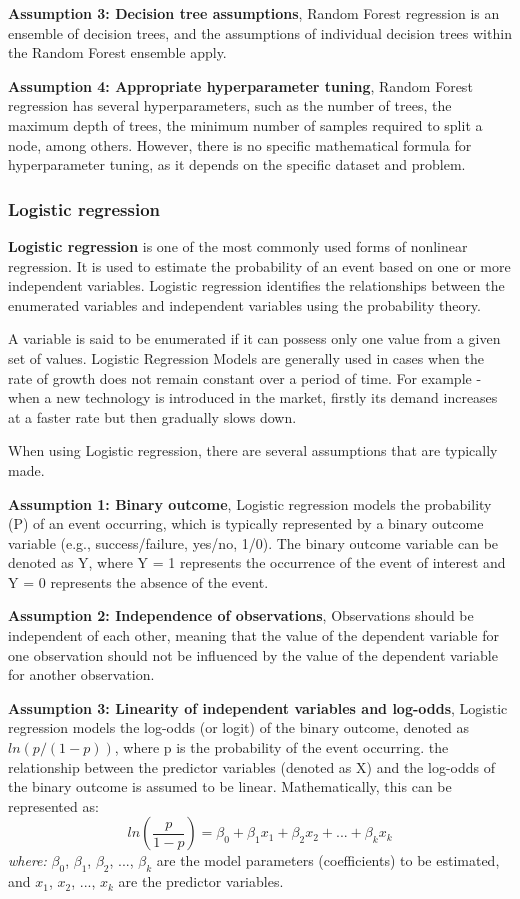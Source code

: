 \textbf{Assumption 3: Decision tree assumptions}, Random Forest regression is an ensemble of decision trees, and the assumptions of individual decision trees within the Random Forest ensemble apply.

\textbf{Assumption 4: Appropriate hyperparameter tuning}, Random Forest regression has several hyperparameters, such as the number of trees, the maximum depth of trees, the minimum number of samples required to split a node, among others. However, there is no specific mathematical formula for hyperparameter tuning, as it depends on the specific dataset and problem.
\subsubsection{Logistic regression}
\textbf{Logistic regression} is one of the most commonly used forms of nonlinear regression. It is used to estimate the probability of an event based on one or more independent variables. Logistic regression identifies the relationships between the enumerated variables and independent variables using the probability theory.

 A variable is said to be enumerated if it can possess only one value from a given set of values. Logistic Regression Models are generally used in cases when the rate of growth does not remain constant over a period of time. For example -when a new technology is introduced in the market, firstly its demand increases at a faster rate but then gradually slows down.
 
 When using Logistic regression, there are several assumptions that are typically made.
 
\textbf{Assumption 1: Binary outcome}, Logistic regression models the probability (P) of an event occurring, which is typically represented by a binary outcome variable (e.g., success/failure, yes/no, 1/0). The binary outcome variable can be denoted as Y, where Y = 1 represents the occurrence of the event of interest and Y = 0 represents the absence of the event.

\textbf{Assumption 2: Independence of observations}, Observations should be independent of each other, meaning that the value of the dependent variable for one observation should not be influenced by the value of the dependent variable for another observation.

\textbf{Assumption 3: Linearity of independent variables and log-odds}, Logistic regression models the log-odds (or logit) of the binary outcome, denoted as $ln(p/(1-p))$, where p is the probability of the event occurring. the relationship between the predictor variables (denoted as X) and the log-odds of the binary outcome is assumed to be linear. Mathematically, this can be represented as:
$$
ln\left(\frac{p}{1-p}\right)={\beta}_{0}+{\beta}_{1} {x}_{1}+{\beta}_{2} {x}_{2}+...+{\beta}_{k} {x}_{k}
$$
\textit{where:} ${\beta}_{0}$, ${\beta}_{1}$, ${\beta}_{2}$, ..., ${\beta}_{k}$ are the model parameters (coefficients) to be estimated, and ${x}_{1}$, ${x}_{2}$, ..., ${x}_{k}$ are the predictor variables.

